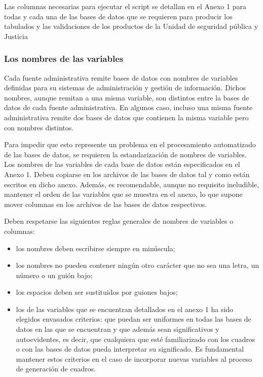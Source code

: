 \documentclass[
  spanish,
]{book}
\begin{document}
Las columnas necesarias para ejecutar el script se detallan en el Anexo 1 para todas y cada una de las bases de datos que se requieren para producir los tabulados y las validaciones de los productos de la Unidad de seguridad pública y Justicia

\hypertarget{los-nombres-de-las-variables}{%
\subsubsection{Los nombres de las variables}\label{los-nombres-de-las-variables}}

Cada fuente administrativa remite bases de datos con nombres de variables definidas para su sistemas de administración y gestión de información. Dichos nombres, aunque remitan a una misma variable, son distintos entre la bases de datos de cada fuente administrativa. En algunos caso, incluso una misma fuente administrativa remite dos bases de datos que contienen la misma variable pero con nombres distintos.

Para impedir que esto represente un problema en el procesamiento automatizado de las bases de datos, se requieren la estandarización de nombres de variables. Los nombres de las variables de cada base de datos están especificados en el Anexo 1. Deben copiarse en los archivos de las bases de datos tal y como están escritos en dicho anexo. Además, es recomendable, aunque no requisito ineludible, mantener el orden de las variables que se muestra en el anexo, lo que supone mover columnas en los archivos de las bases de datos respectivos.

Deben respetarse las siguientes reglas generales de nombres de variables o columnas:

\begin{itemize}
\item
  los nombres deben escribirse siempre en minúscula;
\item
  los nombres no pueden contener ningún otro carácter que no sea una letra, un número o un guión bajo;
\item
  los espacios deben ser sustituidos por guiones bajos;
\item
  los de las variables que se encuentran detallados en el anexo 1 ha sido elegidos envasados criterios: que puedan ser uniformes en todas las bases de datos en las que se encuentran y que además sean significativos y autoevidentes, es decir, que cualquiera que esté familiarizado con los cuadros o con las bases de datos pueda interpretar su significado. Es fundamental mantener estos criterios en el caso de incorporar nuevas variables al proceso de generación de cuadros.
\end{itemize}
\end{document}
